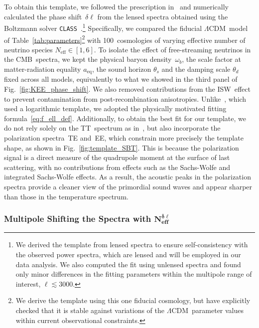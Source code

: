 \documentclass[11pt]{article}
\numberwithin{equation}{section}
\newcommand{\Neff}{N_\mathrm{eff}}
\newcommand{\Nmultipole}{N_\mathrm{eff}^{\delta\ell}}
\begin{document}
To obtain this template, we followed the prescription in~\cite{Follin:2015hya} and numerically calculated the phase shift~$\delta\ell$ from the lensed spectra obtained using the Boltzmann solver \texttt{CLASS}~\cite{Blas:2011rf}.\footnote{We derived the template from lensed spectra to ensure self-consistency with the observed power spectra, which are lensed and will be employed in our data analysis. We also computed the fit using unlensed spectra and found only minor differences in the fitting parameters within the multipole range of interest, $\ell \lesssim 3000$.} Specifically, we compared the fiducial $\Lambda$CDM~model of Table~\ref{tab:parameters}\hskip1pt\footnote{We derive the template using this one fiducial cosmology, but have explicitly checked that it is stable against variations of the $\Lambda$CDM~parameter values within current observational constraints.} with 100~cosmologies of varying effective number of neutrino species $\Neff \in [1,6]$. To isolate the effect of free-streaming neutrinos in the CMB~spectra, we kept the physical baryon density~$\omega_b$, the scale factor at matter-radiation equality $a_\mathrm{eq}$, the sound horizon $\theta_s$ and the damping scale $\theta_d$ fixed across all models, equivalently to what we showed in the third panel of Fig.~\ref{fig:KEE_phase_shift}. We also removed contributions from the ISW~effect to prevent contamination from post-recombination anisotropies. Unlike~\cite{Follin:2015hya}, which used a logarithmic template, we adopted the physically motivated fitting formula~\eqref{eq:f_ell_def}. Additionally, to obtain the best fit for our template, we do not rely solely on the TT~spectrum as in~\cite{Follin:2015hya}, but also incorporate the polarization spectra~TE and~EE, which constrain more precisely the template shape, as shown in Fig.~\ref{fig:template_SBT}. This is because the polarization signal is a direct measure of the quadrupole moment at the surface of last scattering, with no contributions from effects such as the Sachs-Wolfe and integrated Sachs-Wolfe effects. As a result, the acoustic peaks in the polarization spectra provide a cleaner view of the primordial sound waves and appear sharper than those in the temperature spectrum.


\subsubsection[Multipole Shifting the Spectra with \texorpdfstring{$\Nmultipole$}{Neff-delta-ell}]{Multipole Shifting the Spectra with $\mathbf{N}_\mathbf{eff}^{\boldsymbol{\delta\ell}}$}
\label{sec:spectrum-method}
\end{document}
